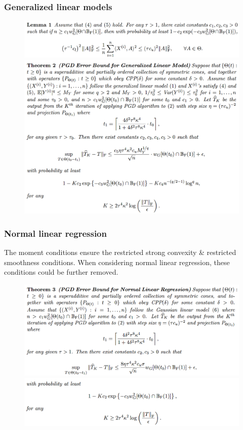 \documentclass{beamer}
\begin{document}
	\begin{frame}
		\frametitle{Generalized linear models}
		\begin{figure}
			\includegraphics[width=.75\linewidth]{image020.png}
			\includegraphics[width=.75\linewidth]{image021.png}
		\end{figure}
	\end{frame}
	
	\begin{frame}
		\frametitle{Normal linear regression}
		The moment conditions ensure the restricted strong convexity \& restricted smoothness conditions. When considering normal linear regression, these conditions could be further removed.
		\begin{figure}
			\includegraphics[width=.75\linewidth]{image022.png}
			\includegraphics[width=.75\linewidth]{image023.png}
		\end{figure}
	\end{frame}
	
\end{document}
